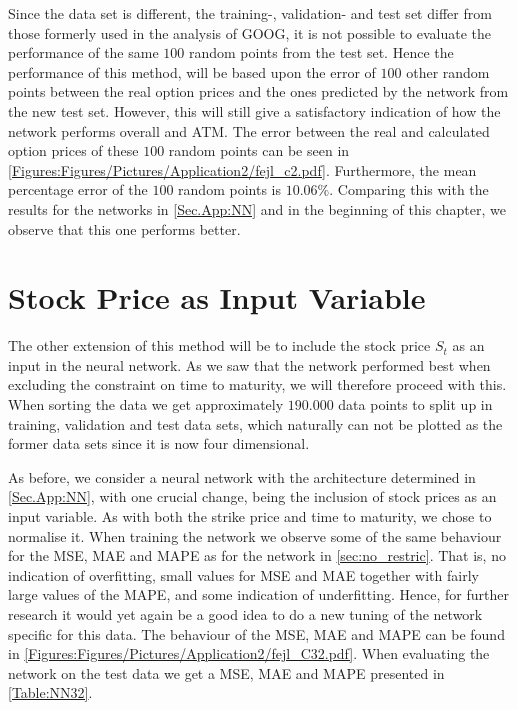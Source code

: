 Since the data set is different, the training-, validation- and test set differ from those formerly used in the analysis of GOOG, it is not possible to evaluate the performance of the same $100$ random points from the test set. Hence the performance of this method, will be based upon the error of $100$ other random points between the real option prices and the ones predicted by the network from the new test set. However, this will still give a satisfactory indication of how the network performs overall and ATM. The error between the real and calculated option prices of these $100$ random points can be seen in \autoref{Figures:Figures/Pictures/Application2/fejl_c2.pdf}. Furthermore, the mean percentage error of the $100$ random points is $10.06\%$. Comparing this with the results for the networks in \autoref{Sec.App:NN} and in the beginning of this chapter, we observe that this one performs better. 


\section{Stock Price as Input Variable}\label{Sec.App2:Stock}
The other extension of this method will be to include the stock price $S_{t}$ as an input in the neural network. As we saw that the network performed best when excluding the constraint on time to maturity, we will therefore proceed with this. When sorting the data we get approximately $190.000$ data points to split up in training, validation and test data sets, which naturally can not be plotted as the former data sets since it is now four dimensional. 

As before, we consider a neural network with the architecture determined in \autoref{Sec.App:NN}, with one crucial change, being the inclusion of stock prices as an input variable. As with both the strike price and time to maturity, we chose to normalise it. When training the network we observe some of the same behaviour for the MSE, MAE and MAPE as for the network in \autoref{sec:no_restric}. That is, no indication of overfitting, small values for MSE and MAE together with fairly large values of the MAPE, and some indication of underfitting. Hence, for further research it would yet again be a good idea to do a new tuning of the network specific for this data. The behaviour of the MSE, MAE and MAPE can be found in \autoref{Figures:Figures/Pictures/Application2/fejl_C32.pdf}. When evaluating the network on the test data we get a MSE, MAE and MAPE presented in \autoref{Table:NN32}. 

